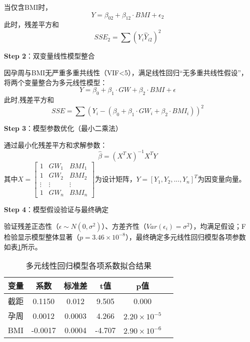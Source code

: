 \documentclass[withoutpreface,bwprint]{cumcmthesis} %
\begin{document}
    当仅含BMI时，
    \begin{equation}
        Y = \beta_{02} + \beta_{12} \cdot BMI + \epsilon_2
    \end{equation}
此时，残差平方和
    \begin{equation}
        SSE_2 = \sum (Y_i \hat{Y}_{i2})^2
    \end{equation}

 
\textbf{Step 2}：双变量线性模型整合  

因孕周与BMI无严重多重共线性（VIF<5），满足线性回归“无多重共线性假设”，将两个变量整合为多元线性模型：  
\begin{equation}
    Y = \beta_0 + \beta_1 \cdot GW + \beta_2 \cdot BMI + \epsilon
\end{equation}
此时,残差平方和
\begin{equation}
    SSE = \sum (Y_i - (\beta_0 + \beta_1 \cdot GW_i + \beta_2 \cdot BMI_i))^2
\end{equation}

\textbf{Step 3}：模型参数优化（最小二乘法）

通过最小化残差平方和求解参数：
\begin{equation}
    \hat{\beta} = (X^TX)^{-1}X^TY
\end{equation}
其中$X = \begin{bmatrix} 1 & GW_1 & BMI_1 \\ 1 & GW_2 & BMI_2 \\ \vdots & \vdots & \vdots \\ 1 & GW_n & BMI_n \end{bmatrix}$为设计矩阵，$Y = [Y_1, Y_2, ..., Y_n]^T$为因变量向量。  

\textbf{Step 4}：模型假设验证与最终确定

  验证残差正态性（$\epsilon \sim N(0, \sigma^2)$）、方差齐性（$Var(\epsilon_i) = \sigma^2$），均满足假设；F检验显示模型整体显著（$p=3.46 \times 10^{-8}$），最终确定多元线性回归模型各项参数如表\ref{tab:多元线性回归模型各项系数拟合结果}所示。


\begin{table}[H]
    \centering  %
    \caption{多元线性回归模型各项系数拟合结果}  %
    \label{tab:多元线性回归模型各项系数拟合结果}  %
    \begin{threeparttable}
        \begin{tabularx}{0.55\textwidth}{l c c c c c}
            \toprule[1.5pt]
            \textbf{变量} & \textbf{系数} & \textbf{标准差} & \textbf{t值} & \textbf{p值}\\ 
            \midrule[1pt]
             截距 & 0.1150 & 0.012 & 9.505 & 0.000  \\
            孕周 & 0.0012 & 0.0003 & 4.266 & $2.20 \times 10^{-5}$  \\
            BMI  &-0.0017 & 0.0004  &-4.707 & $2.90 \times 10^{-6}$  \\

            \bottomrule[1.5pt]
        \end{tabularx}
    \end{threeparttable}
\end{table}
\end{document}
